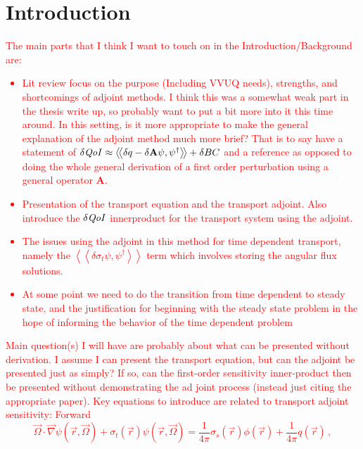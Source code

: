\documentclass[review]{elsarticle}
\newcommand{\vr}{\vec{r}}
\newcommand{\vO}{\vec{\Omega}}
\newcommand{\braSN}{\left\langle \! \left\langle}
\newcommand{\ketSN}{\right\rangle \! \right\rangle}
\newcommand{\grad}{\vec{\nabla}}
\newcommand{\sigt}{\sigma_t}
\newcommand{\sigs}{\sigma_s}
\newcommand{\qoi}{{\it QoI}\xspace}
\newcommand{\comment}[2]{\marginpar{\textcolor{#2}{$\star$}}\textcolor{#2}{#1}\newline}
\newcommand{\iwh}[1]{\comment{#1}{red}}
\newcommand{\iwh}[1]{\phantom{a}}
\begin{document}
\section{Introduction}
\iwh{
The main parts that I think I want to touch on in the Introduction/Background are:
\begin{itemize}
\item Lit review focus on the purpose (Including VVUQ needs), strengths, and shortcomings of adjoint methods. I think this was a somewhat weak part in the thesis write up, so probably want to put a bit more into it this time around. In this setting, is it more appropriate to make the general explanation of the adjoint method much more brief? That is to say have a statement of $\delta \qoi \approx \braSN \delta q - \delta \mathbf{A} \psi , \psi^\dag \ketSN + \delta BC$ and a reference as opposed to doing the whole general derivation of a first order perturbation using a general operator $\mathbf{A}$.
\item Presentation of the transport equation and the transport adjoint. Also introduce the $\delta \qoi$ innerproduct for the transport system using the adjoint.
\item The issues using the adjoint in this method for time dependent transport, namely the $\braSN  \delta \sigt \psi , \psi^\dag \ketSN$ term which involves storing the angular flux solutions. 
\item At some point we need to do the transition from time dependent to steady state, and the justification for beginning with the steady state problem in the hope of informing the behavior of the time dependent problem
\end{itemize}
Main question(s) I will have are probably about what can be presented without derivation. I assume I can present the transport equation, but can the adjoint be presented just as simply? If so, can the first-order sensitivity inner-product then be presented without demonstrating the ad joint process (instead just citing the appropriate paper). Key equations to introduce are related to transport adjoint sensitivity:
Forward
\begin{subequations}\label{eqs:TransportSystem}
\begin{equation}
\label{SS1GTE}
\vO \cdot \grad \psi(\vr,\vO) + \sigt(\vr) \psi(\vr,\vO) = \frac{1}{4 \pi} \sigs(\vr) \phi(\vr) + \frac{1}{4 \pi} q(\vr)\, ,
\end{equation}

\end{subequations}}
\end{document}
